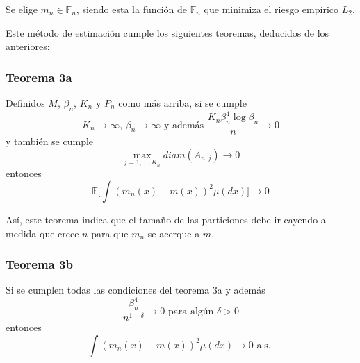 \documentclass[12pt, a4paper]{article}
\begin{document}
Se elige $m_n\in\mathds{F}_n$, siendo esta la función de $\mathds{F}_n$ que minimiza el riesgo empírico $L_2$.

Este método de estimación cumple los siguientes teoremas, deducidos de los anteriores:
\subsubsection{Teorema 3a}
Definidos $M$, $\beta_n$, $K_n$ y $P_n$ como más arriba, si se cumple
$$
K_n\rightarrow\infty
\text{, }
\beta_n\rightarrow\infty
\text{ y además }
\frac{ K_n \beta_n^4 \mathop{log} \beta_n }{n}\rightarrow 0
$$
y también se cumple
$$
\mathop{max}_{j=1,...,K_n} diam(A_{n,j}) \rightarrow 0
$$
entonces
$$
\mathds{E}
\Bigg[ 
\int 
(m_n(x)-m(x))^2
\mu(dx)
\Bigg]
\rightarrow 0
$$

Así, este teorema indica que el tamaño de las particiones debe ir cayendo a medida que crece $n$ para que $m_n$ se acerque a $m$.
\subsubsection{Teorema 3b}
Si se cumplen todas las condiciones del teorema 3a y además 
$$
\frac{\beta_n^4}{n^{1-\delta}}\rightarrow 0 \text{ para algún $\delta>0$}
$$
entonces
$$
\int (m_n(x)-m(x))^2 \mu(dx) \rightarrow 0 \text{ a.s. }
$$
\end{document}

